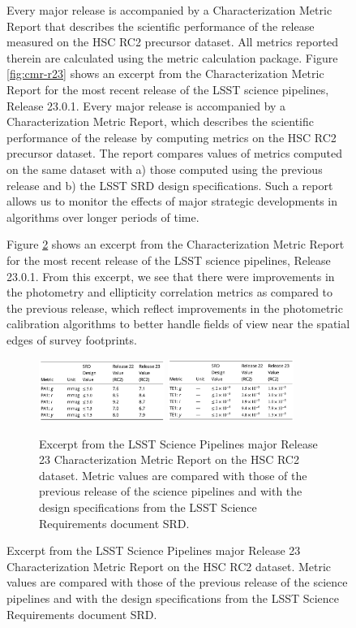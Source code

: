 \begin{figure}[!ht]

Every major release is accompanied by a Characterization Metric Report that describes the scientific performance of the release measured on the HSC RC2 precursor dataset. 
All metrics reported therein are calculated using the \faro metric calculation package. 
Figure \ref{fig:cmr-r23} shows an excerpt from the Characterization Metric Report \cite{dmtr-351} for the most recent release of the LSST science pipelines, Release 23.0.1.
Every major release is accompanied by a Characterization Metric Report, which describes the scientific performance of the release by computing \faro metrics on the HSC RC2 precursor dataset. 
The report compares values of metrics computed on the same dataset with a) those computed using the previous release and b) the LSST SRD design specifications.  
Such a report allows us to monitor the effects of major strategic developments in algorithms over longer periods of time. 

Figure \ref{fig:cmr_r23} shows an excerpt from the Characterization Metric Report \cite{dmtr-351} for the most recent release of the LSST science pipelines, Release 23.0.1.
From this excerpt, we see that there were improvements in the photometry and ellipticity correlation metrics as compared to the previous release, which reflect improvements in the photometric calibration algorithms to better handle fields of view near the spatial edges of survey footprints. 
\begin{figure}[h]

  \centering
  \includegraphics[width=0.45\textwidth]{figures/cmr_r23_photometric_metrics} 
  \hspace{0.5cm}
  \includegraphics[width=0.45\textwidth]{figures/cmr_r23_ellipticity_metrics}
  \par\medskip %
  \caption{Excerpt from the  LSST Science Pipelines major Release 23 Characterization Metric Report on the HSC RC2 dataset. Metric values are compared with those of the previous release of the science pipelines and with the design specifications from the LSST Science Requirements document SRD.}
  \label{fig:cmr_r23}
\end{figure}


\end{figure}
